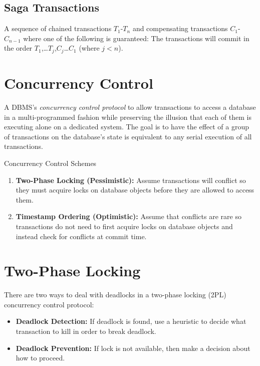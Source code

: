\documentclass[11pt]{article}
\begin{document}
\subsection*{Saga Transactions}
A sequence of chained transactions $T_1$-$T_n$ and compensating transactions $C_1$-$C_{n-1}$ where 
one of the following is guaranteed: The transactions will commit in the order 
$T_1$,\dots$T_j$,$C_j$\dots$C_1$ (where $j<n$).

\section{Concurrency Control}
A DBMS's \textit{concurrency control protocol} to allow transactions to access a database in a 
multi-programmed fashion while preserving the illusion that each of them is executing alone on a 
dedicated system. The goal is to have the effect of a group of transactions on the database's state 
is equivalent to any serial execution of all transactions.
    
Concurrency Control Schemes
\begin{enumerate}
    \item \textbf{Two-Phase Locking (Pessimistic):}
    Assume transactions will conflict so they must acquire locks on database objects before they 
    are allowed to access them.
    
    \item \textbf{Timestamp Ordering (Optimistic):}
    Assume that conflicts are rare so transactions do not need to first acquire locks on database 
    objects and instead check for conflicts at commit time.
\end{enumerate}

\section{Two-Phase Locking}
There are two ways to deal with deadlocks in a two-phase locking (2PL) concurrency control protocol:

\begin{itemize}
    \item \textbf{Deadlock Detection:}
    If deadlock is found, use a heuristic to decide what transaction to kill in order to break 
    deadlock.
    
    \item \textbf{Deadlock Prevention:}
    If lock is not available, then make a decision about how to proceed.
\end{itemize}
\end{document}
